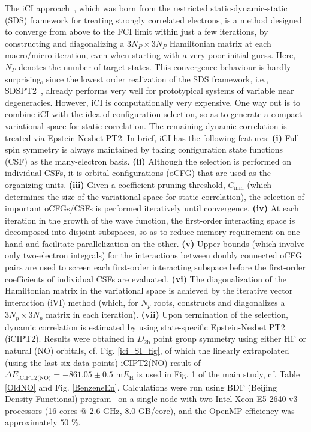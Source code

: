 \documentclass[journal=jcp,manuscript=suppinfo]{achemso}
\begin{document}
The iCI approach~\cite{liu_hoffmann_ici_jctc_2016,liu_hoffmann_ici_jctc_2020}, which was born from the restricted static-dynamic-static~\cite{liu_hoffmann_sds_tca_2014} (SDS) framework for treating strongly correlated electrons, is a method designed to converge from above to the FCI limit within just a few iterations, by constructing and diagonalizing a $3N_P\times3N_P$ Hamiltonian matrix at each macro/micro-iteration, even when starting with a very poor initial guess. Here, $N_P$ denotes the number of target states. This convergence behaviour is hardly surprising, since the lowest order realization of the SDS framework, i.e., SDSPT2~\cite{liu_hoffmann_sdspt2_mp_2017}, already performs very well for prototypical systems of variable near degeneracies. However, iCI is computationally very expensive. One way out is to combine iCI with the idea of configuration selection, so as to generate a compact variational space for static correlation. The remaining dynamic correlation is treated via Epstein-Nesbet PT2. In brief, iCI has the following features: {\bf{(i)}} Full spin symmetry is always maintained by taking configuration state functions (CSF) as the many-electron basis. {\bf{(ii)}} Although the selection is performed on individual CSFs, it is orbital configurations (oCFG) that are used as the organizing units. {\bf{(iii)}} Given a coefficient pruning threshold, $C_{\text{min}}$ (which determines the size of the variational space for static correlation), the selection of important oCFGs/CSFs is performed iteratively until convergence. {\bf{(iv)}} At each iteration in the growth of the wave function, the first-order interacting space is decomposed into disjoint subspaces, so as to reduce memory requirement on one hand and facilitate parallelization on the other. {\bf{(v)}} Upper bounds (which involve only two-electron integrals) for the interactions between doubly connected oCFG pairs are used to screen each first-order interacting subspace before the first-order coefficients of individual CSFs are evaluated. {\bf{(vi)}} The diagonalization of the Hamiltonian matrix in the variational space is achieved by the iterative vector interaction (iVI) method\cite{iVIa,iVIb} (which, for $N_p$ roots, constructs and diagonalizes a $3N_p\times 3N_p$ matrix in each iteration). {\bf{(vii)}} Upon termination of the selection, dynamic correlation is estimated by using state-specific Epstein-Nesbet PT2 (iCIPT2). Results were obtained in $D_{2\text{h}}$ point group symmetry using either HF or natural (NO) orbitals, cf. Fig. \ref{ici_SI_fig}, of which the linearly extrapolated (using the last six data points) iCIPT2(NO) result of $\Delta E_{\text{iCIPT2(NO)}} = -861.05\pm0.5$ m$E_{\text{H}}$ is used in Fig. 1 of the main study, cf. Table \ref{OldNO} and Fig. \ref{BenzeneEn}. Calculations were run using BDF (Beijing Density Functional) program~\cite{bdf_prog_tca_1997,bdf_prog_jcp_2020} on a single node with two Intel Xeon E5-2640 v3 processors (16 cores $@$ 2.6 GHz, 8.0 GB/core), and the OpenMP efficiency was approximately $50$ $\%$.\\
\end{document}

